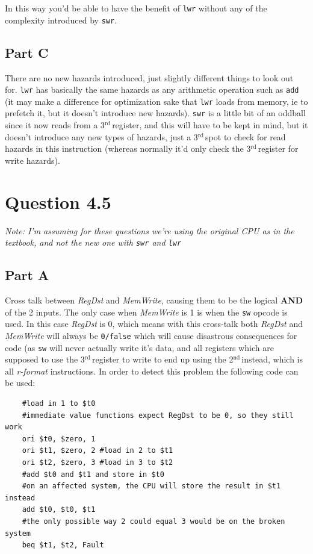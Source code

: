 \documentclass[11pt]{article} %
\newcommand{\strong}[1]{\textbf{#1}}
\newcommand{\code}[1]{\texttt{#1}}
\newcommand{\nd}{$^{\text{nd}\ }$}
\newcommand{\rd}{$^{\text{rd}\ }$}
\begin{document}
In this way you'd be able to have the benefit of \code{lwr} without any of the complexity introduced by \code{swr}.

\subsection{Part C}

There are no new hazards introduced, just slightly different things to look out for. \code{lwr} has basically the same hazards as any arithmetic operation such as \code{add} (it may make a difference for optimization sake that \code{lwr} loads from memory, ie to prefetch it, but it doesn't introduce new hazards). \code{swr} is a little bit of an oddball since it now reads from a 3\rd register, and this will have to be kept in mind, but it doesn't introduce any new types of hazards, just a 3\rd spot to check for read hazards in this instruction (whereas normally it'd only check the 3\rd register for write hazards).


\section{Question 4.5}

\emph{Note: I'm assuming for these questions we're using the original CPU as in the textbook, and not the new one with \code{swr} and \code{lwr}}

\subsection{Part A}

Cross talk between \emph{RegDst} and \emph{MemWrite}, causing them to be the logical \strong{AND} of the 2 inputs. The only case when \emph{MemWrite} is 1 is when the \code{sw} opcode is used. In this case \emph{RegDst} is 0, which means with this cross-talk both \emph{RegDst} and \emph{MemWrite} will always be \code{0/false} which will cause disastrous consequences for code (as \code{sw} will never actually write it's data, and all registers which are supposed to use the 3\rd register to write to end up using the 2\nd instead, which is all \emph{r-format} instructions. In order to detect this problem the following code can be used:

\begin{verbatim}
    #load in 1 to $t0
    #immediate value functions expect RegDst to be 0, so they still work
    ori $t0, $zero, 1
    ori $t1, $zero, 2 #load in 2 to $t1
    ori $t2, $zero, 3 #load in 3 to $t2
    #add $t0 and $t1 and store in $t0
    #on an affected system, the CPU will store the result in $t1 instead
    add $t0, $t0, $t1 
    #the only possible way 2 could equal 3 would be on the broken system
    beq $t1, $t2, Fault 
\end{verbatim}
\end{document}
